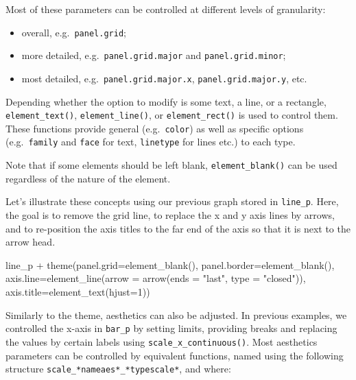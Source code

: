 \documentclass[
]{book}
\newenvironment{Shaded}{\begin{snugshade}}{\end{snugshade}}
\newcommand{\AttributeTok}[1]{\textcolor[rgb]{0.77,0.63,0.00}{#1}}
\newcommand{\DecValTok}[1]{\textcolor[rgb]{0.00,0.00,0.81}{#1}}
\newcommand{\FunctionTok}[1]{\textcolor[rgb]{0.00,0.00,0.00}{#1}}
\newcommand{\NormalTok}[1]{#1}
\newcommand{\SpecialCharTok}[1]{\textcolor[rgb]{0.00,0.00,0.00}{#1}}
\newcommand{\StringTok}[1]{\textcolor[rgb]{0.31,0.60,0.02}{#1}}
\providecommand{\tightlist}{%
  \setlength{\itemsep}{0pt}\setlength{\parskip}{0pt}}
\begin{document}
Most of these parameters can be controlled at different levels of granularity:

\begin{itemize}
\tightlist
\item
  overall, e.g.~\texttt{panel.grid};
\item
  more detailed, e.g.~\texttt{panel.grid.major} and \texttt{panel.grid.minor};
\item
  most detailed, e.g.~\texttt{panel.grid.major.x}, \texttt{panel.grid.major.y}, etc.
\end{itemize}

Depending whether the option to modify is some text, a line, or a rectangle, \texttt{element\_text()}, \texttt{element\_line()}, or \texttt{element\_rect()} is used to control them. These functions provide general (e.g.~\texttt{color}) as well as specific options (e.g.~\texttt{family} and \texttt{face} for text, \texttt{linetype} for lines etc.) to each type.

Note that if some elements should be left blank, \texttt{element\_blank()} can be used regardless of the nature of the element.

Let's illustrate these concepts using our previous graph stored in \texttt{line\_p}. Here, the goal is to remove the grid line, to replace the x and y axis lines by arrows, and to re-position the axis titles to the far end of the axis so that it is next to the arrow head.

\begin{Shaded}
\begin{Highlighting}[]
\NormalTok{line\_p }\SpecialCharTok{+}
  \FunctionTok{theme}\NormalTok{(}\AttributeTok{panel.grid=}\FunctionTok{element\_blank}\NormalTok{(), }
        \AttributeTok{panel.border=}\FunctionTok{element\_blank}\NormalTok{(),}
        \AttributeTok{axis.line=}\FunctionTok{element\_line}\NormalTok{(}\AttributeTok{arrow =} \FunctionTok{arrow}\NormalTok{(}\AttributeTok{ends =} \StringTok{"last"}\NormalTok{, }\AttributeTok{type =} \StringTok{"closed"}\NormalTok{)),}
        \AttributeTok{axis.title=}\FunctionTok{element\_text}\NormalTok{(}\AttributeTok{hjust=}\DecValTok{1}\NormalTok{))}
\end{Highlighting}
\end{Shaded}

Similarly to the theme, aesthetics can also be adjusted. In previous examples, we controlled the x-axis in \texttt{bar\_p} by setting limits, providing breaks and replacing the values by certain labels using \texttt{scale\_x\_continuous()}.
Most aesthetics parameters can be controlled by equivalent functions, named using the following structure \texttt{scale\_*nameaes*\_*typescale*}, and where:
\end{document}
